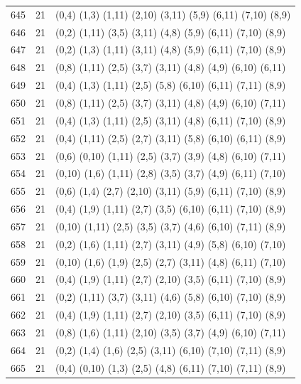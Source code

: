 \begin{appendix}
{\begin{longtable}{lll}
    645& 21 & (0,4)   (1,3)   (1,11)  (2,10)  (3,11)  (5,9)   (6,11)  (7,10)  (8,9)\\
    646& 21 & (0,2)   (1,11)  (3,5)   (3,11)  (4,8)   (5,9)   (6,11)  (7,10)  (8,9)\\
    647& 21 & (0,2)   (1,3)   (1,11)  (3,11)  (4,8)   (5,9)   (6,11)  (7,10)  (8,9)\\
    648& 21 & (0,8)   (1,11)  (2,5)   (3,7)   (3,11)  (4,8)   (4,9)   (6,10)  (6,11)\\
    649& 21 & (0,4)   (1,3)   (1,11)  (2,5)   (5,8)   (6,10)  (6,11)  (7,11)  (8,9)\\
    650& 21 & (0,8)   (1,11)  (2,5)   (3,7)   (3,11)  (4,8)   (4,9)   (6,10)  (7,11)\\
    651& 21 & (0,4)   (1,3)   (1,11)  (2,5)   (3,11)  (4,8)   (6,11)  (7,10)  (8,9)\\
    652& 21 & (0,4)   (1,11)  (2,5)   (2,7)   (3,11)  (5,8)   (6,10)  (6,11)  (8,9)\\
    653& 21 & (0,6)   (0,10)  (1,11)  (2,5)   (3,7)   (3,9)   (4,8)   (6,10)  (7,11)\\
    654& 21 & (0,10)  (1,6)   (1,11)  (2,8)   (3,5)   (3,7)   (4,9)   (6,11)  (7,10)\\
    655& 21 & (0,6)   (1,4)   (2,7)   (2,10)  (3,11)  (5,9)   (6,11)  (7,10)  (8,9)\\
    656& 21 & (0,4)   (1,9)   (1,11)  (2,7)   (3,5)   (6,10)  (6,11)  (7,10)  (8,9)\\
    657& 21 & (0,10)  (1,11)  (2,5)   (3,5)   (3,7)   (4,6)   (6,10)  (7,11)  (8,9)\\
    658& 21 & (0,2)   (1,6)   (1,11)  (2,7)   (3,11)  (4,9)   (5,8)   (6,10)  (7,10)\\
    659& 21 & (0,10)  (1,6)   (1,9)   (2,5)   (2,7)   (3,11)  (4,8)   (6,11)  (7,10)\\
    660& 21 & (0,4)   (1,9)   (1,11)  (2,7)   (2,10)  (3,5)   (6,11)  (7,10)  (8,9)\\
    661& 21 & (0,2)   (1,11)  (3,7)   (3,11)  (4,6)   (5,8)   (6,10)  (7,10)  (8,9)\\
    662& 21 & (0,4)   (1,9)   (1,11)  (2,7)   (2,10)  (3,5)   (6,11)  (7,10)  (8,9)\\
    663& 21 & (0,8)   (1,6)   (1,11)  (2,10)  (3,5)   (3,7)   (4,9)   (6,10)  (7,11)\\
    664& 21 & (0,2)   (1,4)   (1,6)   (2,5)   (3,11)  (6,10)  (7,10)  (7,11)  (8,9)\\
    665& 21 & (0,4)   (0,10)  (1,3)   (2,5)   (4,8)   (6,11)  (7,10)  (7,11)  (8,9)\\

\end{longtable}}
\end{appendix}
